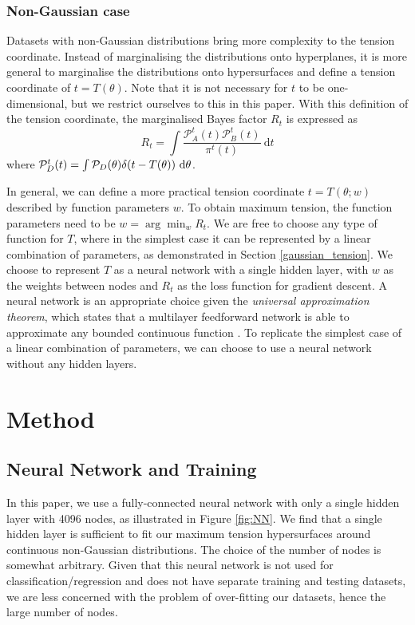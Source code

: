 \documentclass[%
 reprint,
 amsmath,amssymb,
 aps,
]{revtex4-2}
\begin{document}
\subsubsection{Non-Gaussian case} \label{non_gaussian}

Datasets with non-Gaussian distributions bring more complexity to the tension coordinate. Instead of marginalising the distributions onto hyperplanes, it is more general to marginalise the distributions onto hypersurfaces and define a tension coordinate of $t = T(\theta)$. Note that it is not necessary for $t$ to be one-dimensional, but we restrict ourselves to this in this paper. With this definition of the tension coordinate, the marginalised Bayes factor $R_t$ is expressed as
\begin{equation} \label{margin_R}
    R_t = \int \frac{\mathcal{P}_A^{t}(t) \mathcal{P}_B^{t}(t)}{\pi^{t}(t)} \ \textrm{d}t
\end{equation}
where $\mathcal{P}_D^{t}(t) = \int \mathcal{P}_D(\theta) \delta(t - T(\theta)) \ \rm{d}\theta$.

In general, we can define a more practical tension coordinate $t = T(\theta; w)$ described by function parameters $w$. To obtain maximum tension, the function parameters need to be $w = \arg \min_w R_t$. We are free to choose any type of function for $T$, where in the simplest case it can be represented by a linear combination of parameters, as demonstrated in Section \ref{gaussian_tension}. We choose to represent $T$ as a neural network with a single hidden layer, with $w$ as the weights between nodes and $R_t$ as the loss function for gradient descent. A neural network is an appropriate choice given the \textit{universal approximation theorem}, which states that a multilayer feedforward network is able to approximate any bounded continuous function \cite{Hornik1989}. To replicate the simplest case of a linear combination of parameters, we can choose to use a neural network without any hidden layers.


\section{Method}

\subsection{Neural Network and Training}

In this paper, we use a fully-connected neural network with only a single hidden layer with 4096 nodes, as illustrated in Figure \ref{fig:NN}. We find that a single hidden layer is sufficient to fit our maximum tension hypersurfaces around continuous non-Gaussian distributions. The choice of the number of nodes is somewhat arbitrary. Given that this neural network is not used for classification/regression and does not have separate training and testing datasets, we are less concerned with the problem of over-fitting our datasets, hence the large number of nodes. 
\end{document}
